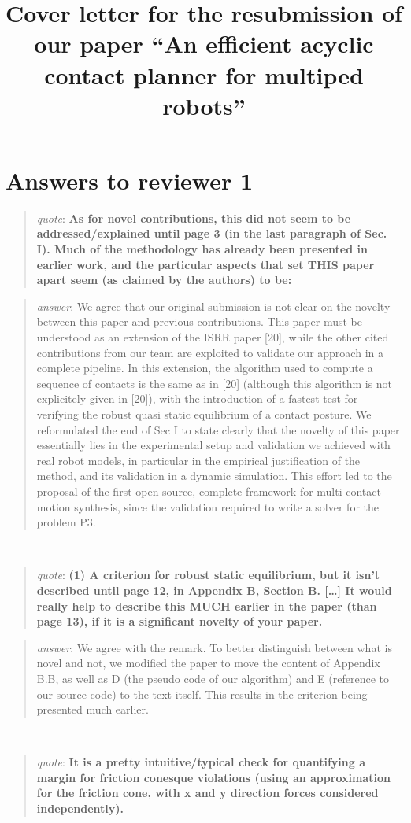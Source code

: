 \documentclass[a4paper]{article}
\author {}
\title {Cover letter for the resubmission of our paper ``An efficient acyclic contact planner for multiped robots''}
\date {}
\newcommand\quot[1]{\begin{quote} \textit{quote}: \textbf{#1}\end{quote}}
\newcommand\as[1]{\begin{quote} \textit{answer}: {#1}\end{quote} \leavevmode \\ }
\begin{document}
\maketitle


\section{Answers to reviewer 1}

\quot {As for novel contributions, this did not seem to be addressed/explained
until page 3 (in the last paragraph of Sec. I). Much of the methodology
has already been presented in earlier work, and the particular aspects
that set THIS paper apart seem (as claimed by the authors) to be: 
}

\as{We agree that our original submission is not clear on the novelty between this paper and previous contributions.
This paper must be understood as an extension of the ISRR paper [20], while the other cited contributions from our team 
are exploited to validate our approach in a complete pipeline.
In this extension, the algorithm used to compute a sequence of contacts is the same as in [20] (although this
algorithm is not explicitely given in [20]), with the introduction of a fastest test for verifying the robust quasi static equilibrium of a contact posture.
We reformulated the end of Sec I to state clearly that the novelty of this paper essentially lies in the experimental setup and validation we achieved with real robot models, in particular
in the empirical justification of the method, and its validation in a dynamic simulation. This effort led to the proposal of the first open source, complete framework for multi contact motion synthesis, since 
the validation required to write a solver for the problem P3. }

\quot { (1) A criterion for robust static equilibrium, but it isn't
described until page 12, in Appendix B, Section B. [\dots]  It would really help to describe this MUCH earlier in
the paper (than page 13), if it is a significant novelty of your paper.}

\as{We agree with the remark. To better distinguish between what is novel and not, we modified the paper to move the content of Appendix B.B, as well as D  (the pseudo code of our algorithm) and E (reference to our source code) to the text itself. This results in the criterion being presented much earlier.}

\quot{It is a pretty intuitive/typical check for quantifying a
margin for friction conesque violations (using an approximation for
the friction cone, with x and y direction forces considered
independently). }
\end{document}
